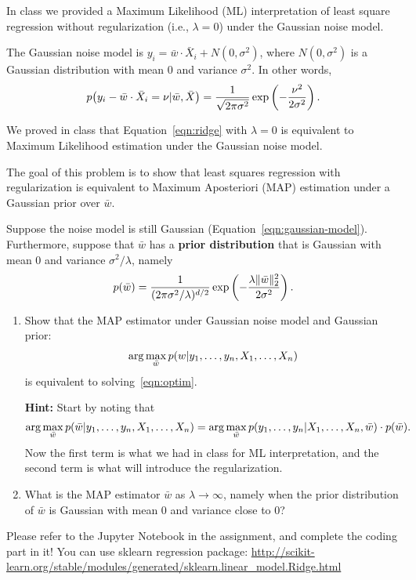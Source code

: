 \documentclass[11pt]{article}
\newenvironment{problem}[2][Problem]{\begin{trivlist}
\item[\hskip \labelsep {\bfseries #1}\hskip \labelsep {\bfseries #2.}]}{\end{trivlist}}
\begin{document}
\begin{problem}{3$^*$ (15 points) Ridge regression $\equiv$ MAP estimation with Gaussian prior}

In  class we provided a Maximum Likelihood (ML) interpretation of least square regression without regularization (i.e., $\lambda=0$) under the Gaussian noise model. 

The Gaussian noise model is $y_i= \bar w\cdot \bar X_i +N(0,\sigma^2)$, where $N(0,\sigma^2)$ is a Gaussian distribution with mean 0 and variance $\sigma^2$. In other words, 
\begin{align}
p{\left({y_i-\bar w\cdot \bar X_i=\nu|\bar w, \bar X}\right)} = \frac1{\sqrt{2\pi\sigma^2}}\exp\left(-\frac{\nu^2}{2\sigma^2}\right). 
\label{eqn:gaussian-model}
\end{align}

 We proved in class that Equation~\eqref{eqn:ridge} with $\lambda=0$  is equivalent to Maximum Likelihood estimation under the Gaussian noise model. 
 
The goal of this problem is to show that least squares regression with regularization is equivalent to Maximum Aposteriori (MAP) estimation under a Gaussian prior over $\bar w$. 

Suppose the noise model is still Gaussian (Equation~\eqref{eqn:gaussian-model}). Furthermore, suppose that $\bar w$ has a \textbf{prior distribution} that is Gaussian with mean $0$ and variance $\sigma^2/\lambda$, namely
\[
p{\left({\bar w}\right)}=\frac1{(2\pi\sigma^2/\lambda)^{d/2}}\exp\left(-\frac{\lambda\|\bar w\|_2^2}{2\sigma^2}\right).
\]

\begin{enumerate}
\item 
Show that the MAP estimator under Gaussian noise model and Gaussian prior:
\begin{align}
\label{eqn:linear}
\arg\max_{\bar w} p{\left({w|y_1,\ldots, y_n,  X_1,\ldots,  X_n}\right)}	
\end{align}
is equivalent to solving~\eqref{eqn:optim}. 

\textbf{Hint:} Start by noting that
\[
\arg\max_{\bar w}p{\left({\bar w|y_1,\ldots, y_n,  X_1,\ldots,  X_n}\right)} = \arg\max_{\bar w}p{\left({y_1,\ldots, y_n|  X_1,\ldots,  X_n, \bar w}\right)} \cdot p{\left({\bar w}\right)}.
\]
Now the first term is what we had in class for ML interpretation, and the second term is what will introduce the regularization.
\item
 What is the MAP estimator $\bar w$ as $\lambda\to\infty$, namely when the prior distribution of $\bar w$ is Gaussian with mean 0 and variance close to 0?
\vfill
\end{enumerate}
\end{problem}




\begin{problem}{4 (25 points) Linear and Quadratic Regression}
Please refer to the Jupyter Notebook in the assignment, and complete the coding part in it!
You can use sklearn regression package: \url{http://scikit-learn.org/stable/modules/generated/sklearn.linear_model.Ridge.html}
\end{problem}
\end{document}
